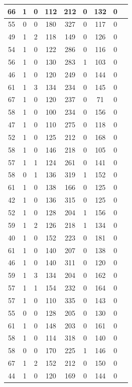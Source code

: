 \documentclass{article}
\begin{document}
\begin{longtable}{
|
c|c|c|c|c|c|c|c|c|}
\hline
66 & 1 & 0 & 112 & 212 & 0 & 132 & 0 \\
\hline
55 & 0 & 0 & 180 & 327 & 0 & 117 & 0 \\
\hline
49 & 1 & 2 & 118 & 149 & 0 & 126 & 0 \\
\hline
54 & 1 & 0 & 122 & 286 & 0 & 116 & 0 \\
\hline
56 & 1 & 0 & 130 & 283 & 1 & 103 & 0 \\
\hline
46 & 1 & 0 & 120 & 249 & 0 & 144 & 0 \\
\hline
61 & 1 & 3 & 134 & 234 & 0 & 145 & 0 \\
\hline
67 & 1 & 0 & 120 & 237 & 0 & 71 & 0 \\
\hline
58 & 1 & 0 & 100 & 234 & 0 & 156 & 0 \\
\hline
47 & 1 & 0 & 110 & 275 & 0 & 118 & 0 \\
\hline
52 & 1 & 0 & 125 & 212 & 0 & 168 & 0 \\
\hline
58 & 1 & 0 & 146 & 218 & 0 & 105 & 0 \\
\hline
57 & 1 & 1 & 124 & 261 & 0 & 141 & 0 \\
\hline
58 & 0 & 1 & 136 & 319 & 1 & 152 & 0 \\
\hline
61 & 1 & 0 & 138 & 166 & 0 & 125 & 0 \\
\hline
42 & 1 & 0 & 136 & 315 & 0 & 125 & 0 \\
\hline
52 & 1 & 0 & 128 & 204 & 1 & 156 & 0 \\
\hline
59 & 1 & 2 & 126 & 218 & 1 & 134 & 0 \\
\hline
40 & 1 & 0 & 152 & 223 & 0 & 181 & 0 \\
\hline
61 & 1 & 0 & 140 & 207 & 0 & 138 & 0 \\
\hline
46 & 1 & 0 & 140 & 311 & 0 & 120 & 0 \\
\hline
59 & 1 & 3 & 134 & 204 & 0 & 162 & 0 \\
\hline
57 & 1 & 1 & 154 & 232 & 0 & 164 & 0 \\
\hline
57 & 1 & 0 & 110 & 335 & 0 & 143 & 0 \\
\hline
55 & 0 & 0 & 128 & 205 & 0 & 130 & 0 \\
\hline
61 & 1 & 0 & 148 & 203 & 0 & 161 & 0 \\
\hline
58 & 1 & 0 & 114 & 318 & 0 & 140 & 0 \\
\hline
58 & 0 & 0 & 170 & 225 & 1 & 146 & 0 \\
\hline
67 & 1 & 2 & 152 & 212 & 0 & 150 & 0 \\
\hline
44 & 1 & 0 & 120 & 169 & 0 & 144 & 0 \\

\end{longtable}
\end{document}
